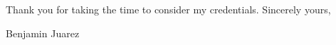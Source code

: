 % 
% 

Thank you for taking the time to consider my credentials.
\bigskip %
Sincerely yours,


Benjamin Juarez

% 
%  

